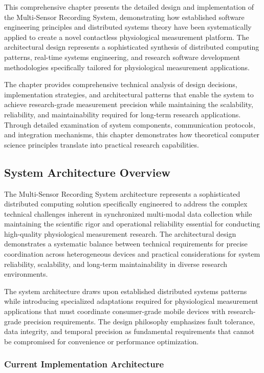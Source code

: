 \documentclass[11pt,a4paper]{report}
\begin{document}
This comprehensive chapter presents the detailed design and implementation of the Multi-Sensor Recording System,
demonstrating how established software engineering principles and distributed systems theory have been systematically
applied to create a novel contactless physiological measurement platform. The architectural design represents a
sophisticated synthesis of distributed computing patterns, real-time systems engineering, and research software
development methodologies specifically tailored for physiological measurement applications.

The chapter provides comprehensive technical analysis of design decisions, implementation strategies, and architectural
patterns that enable the system to achieve research-grade measurement precision while maintaining the scalability,
reliability, and maintainability required for long-term research applications. Through detailed examination of system
components, communication protocols, and integration mechanisms, this chapter demonstrates how theoretical computer
science principles translate into practical research capabilities.

\subsection{System Architecture Overview}

The Multi-Sensor Recording System architecture represents a sophisticated distributed computing solution specifically
engineered to address the complex technical challenges inherent in synchronized multi-modal data collection while
maintaining the scientific rigor and operational reliability essential for conducting high-quality physiological
measurement research. The architectural design demonstrates a systematic balance between technical requirements for
precise coordination across heterogeneous devices and practical considerations for system reliability, scalability, and
long-term maintainability in diverse research environments.

The system architecture draws upon established distributed systems patterns while introducing specialized adaptations
required for physiological measurement applications that must coordinate consumer-grade mobile devices with
research-grade precision requirements. The design philosophy emphasizes fault tolerance, data integrity, and temporal
precision as fundamental requirements that cannot be compromised for convenience or performance optimization.

\subsubsection{Current Implementation Architecture}
\end{document}
